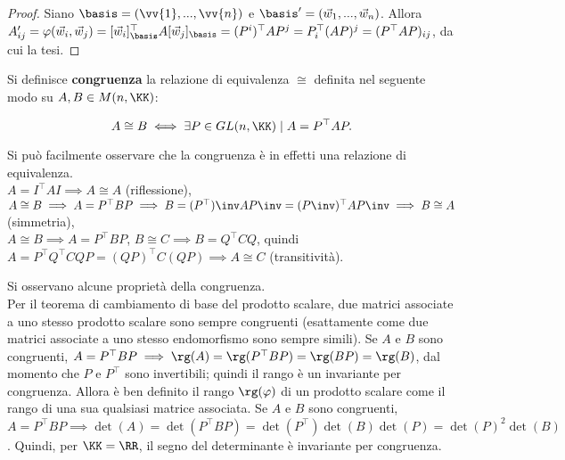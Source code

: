 \documentclass[11pt]{article}
\begin{document}
	\begin{proof} Siano $\basis = (\vv{1}, ..., \vv{n})$ e $\basis' = (\vec{w}_1, ..., \vec{w}_n)$. Allora
		$A'_{ij} = \varphi(\vec{w}_i, \vec{w}_j) = [\vec{w}_i]_{\basis}^\top A [\vec{w}_j]_{\basis} =
		(P^i)^\top A P^j = P_i^\top (AP)^j = (P^\top AP)_{ij}$, da cui la tesi.
	\end{proof}

	\begin{definition}
		Si definisce \textbf{congruenza} la relazione di equivalenza $\cong$ definita nel seguente
		modo su $A, B \in M(n, \KK)$:
		
		\[ A \cong B \iff \exists P \in GL(n, \KK) \mid A = P^\top A P. \]
	\end{definition}

	\begin{remark}
		Si può facilmente osservare che la congruenza è in effetti una relazione di equivalenza. \\
		
		\li $A = I^\top A I \implies A \cong A$ (riflessione), \\
		\li $A \cong B \implies A = P^\top B P \implies B = (P^\top)\inv A P\inv = (P\inv)^\top A P\inv \implies B \cong A$ (simmetria), \\
		\li $A \cong B \implies A = P^\top B P$, $B \cong C \implies B = Q^\top C Q$, quindi $A = P^\top Q^\top C Q P =
		(QP)^\top C (QP) \implies A \cong C$ (transitività). 
	\end{remark}

	\begin{remark}
		Si osservano alcune proprietà della congruenza. \\
		
		\li Per il teorema di cambiamento di base del prodotto scalare, due matrici associate a uno stesso
		prodotto scalare sono sempre congruenti (esattamente come due matrici associate a uno stesso
		endomorfismo sono sempre simili).
		\li Se $A$ e $B$ sono congruenti, $A = P^\top B P \implies \rg(A) = \rg(P^\top B P) = \rg(BP) = \rg(B)$,
		dal momento che $P$ e $P^\top$ sono invertibili; quindi il rango è un invariante per congruenza. Allora
		è ben definito il rango $\rg(\varphi)$ di un prodotto scalare come il rango di una sua qualsiasi matrice
		associata.
		\li Se $A$ e $B$ sono congruenti, $A = P^\top B P \implies \det(A) = \det(P^\top B P) = \det(P^\top) \det(B) \det(P)=
		\det(P)^2 \det(B)$. Quindi, per $\KK = \RR$, il segno del determinante è invariante per congruenza.
	\end{remark}
\end{document}
